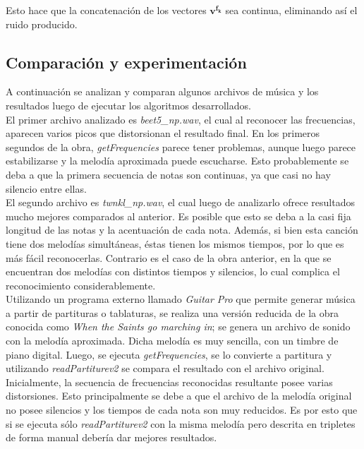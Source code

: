 \documentclass[journal, monochrome]{IEEEtran}
\begin{document}
Esto hace que la concatenación de los vectores $\mathbf{v^{f_k}}$ sea continua, eliminando así el ruido producido.


\subsection{Comparación y experimentación}

A continuación se analizan y comparan algunos archivos de música y los resultados luego de ejecutar los algoritmos desarrollados.  \\

El primer archivo analizado es \emph{beet5\_np.wav}, el cual al reconocer las frecuencias, aparecen varios picos que distorsionan el resultado final. En los primeros segundos de la obra, \emph{getFrequencies} parece tener problemas, aunque luego parece estabilizarse y la melodía aproximada puede escucharse. Esto probablemente se deba a que la primera secuencia de notas son continuas, ya que casi no hay silencio entre ellas.  \\

El segundo archivo es \emph{twnkl\_np.wav}, el cual luego de analizarlo ofrece resultados mucho mejores comparados al anterior. Es posible que esto se deba a la casi fija longitud de las notas y la acentuación de cada nota. Además, si bien esta canción tiene dos melodías simultáneas, éstas tienen los mismos tiempos, por lo que es más fácil reconocerlas. Contrario es el caso de la obra anterior, en la que se encuentran dos melodías con distintos tiempos y silencios, lo cual complica el reconocimiento considerablemente. \\ 

Utilizando un programa externo llamado \emph{Guitar Pro} que permite generar música a partir de partituras o tablaturas, se realiza una versión reducida de la obra conocida como \emph{When the Saints go marching in}; se genera un archivo de sonido con la melodía aproximada. Dicha melodía es muy sencilla, con un timbre de piano digital. Luego, se ejecuta \emph{getFrequencies}, se lo convierte a partitura y utilizando \emph{readPartiturev2} se compara el resultado con el archivo original. Inicialmente, la secuencia de frecuencias reconocidas resultante posee varias distorsiones. Esto principalmente se debe a que el archivo de la melodía original no posee silencios y los tiempos de cada nota son muy reducidos. Es por esto que si se ejecuta sólo \emph{readPartiturev2} con la misma melodía pero descrita en tripletes de forma manual debería dar mejores resultados.
\end{document}
